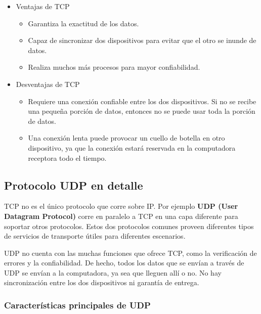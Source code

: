 \begin{itemize}
    \item Ventajas de TCP 
    \begin{itemize}
        \item Garantiza la exactitud de los datos.
        \item Capaz de sincronizar dos dispositivos para evitar que el otro se inunde de datos.

\item Realiza muchos más procesos para mayor confiabilidad.

    \end{itemize}
    \item Desventajas de TCP
        \begin{itemize}
            \item Requiere una conexión confiable entre los dos dispositivos. Si no se recibe una pequeña porción de datos, entonces no se puede usar toda la porción de datos.
            \item Una conexión lenta puede provocar un cuello de botella en otro dispositivo, ya que la conexión estará reservada en la computadora receptora todo el tiempo.
        \end{itemize}



\end{itemize}



\subsection{Protocolo UDP en detalle}

TCP no es el único protocolo que corre sobre IP. Por ejemplo \textbf{UDP (User Datagram Protocol)} corre en paralelo a TCP en una capa diferente para soportar otros protocolos. Estos dos protocolos comunes proveen diferentes tipos de servicios de transporte útiles para diferentes escenarios. 

UDP no cuenta con las muchas funciones que ofrece TCP, como la verificación de errores y la confiabilidad. De hecho, todos los datos que se envían a través de UDP se envían a la computadora, ya sea que lleguen allí o no. No hay sincronización entre los dos dispositivos ni garantía de entrega.

\subsubsection{Características principales de UDP}

